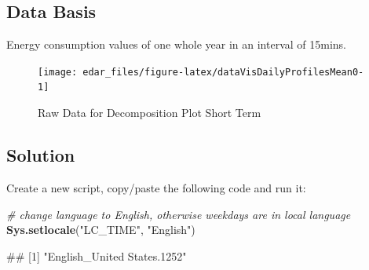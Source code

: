 \documentclass[
  a4paperpaper,
]{book}
\newenvironment{Shaded}{\begin{snugshade}}{\end{snugshade}}
\newcommand{\CommentTok}[1]{\textcolor[rgb]{0.56,0.35,0.01}{\textit{#1}}}
\newcommand{\KeywordTok}[1]{\textcolor[rgb]{0.13,0.29,0.53}{\textbf{#1}}}
\newcommand{\NormalTok}[1]{#1}
\newcommand{\StringTok}[1]{\textcolor[rgb]{0.31,0.60,0.02}{#1}}
\let\oldShaded\Shaded
\let\endoldShaded\endShaded
\renewenvironment{Shaded}{\footnotesize\oldShaded}{\endoldShaded}
\let\oldverbatim\verbatim
\let\endoldverbatim\endverbatim
\renewenvironment{verbatim}{\footnotesize\oldverbatim}{\endoldverbatim}
\begin{document}
\hypertarget{data-basis-14}{%
\subsection{Data Basis}\label{data-basis-14}}

Energy consumption values of one whole year in an interval of 15mins.

\begin{figure}
\texttt{[image: edar\_files/figure-latex/dataVisDailyProfilesMean0-1]} \caption{Raw Data for Decomposition Plot Short Term}\label{fig:dataVisDailyProfilesMean0}
\end{figure}

\newpage

\hypertarget{solution-14}{%
\subsection{Solution}\label{solution-14}}

Create a new script, copy/paste the following code and run it:

\begin{Shaded}
\begin{Highlighting}[]
\CommentTok{# change language to English, otherwise weekdays are in local language}
\KeywordTok{Sys.setlocale}\NormalTok{(}\StringTok{"LC_TIME"}\NormalTok{, }\StringTok{"English"}\NormalTok{)}
\end{Highlighting}
\end{Shaded}

\begin{verbatim}
## [1] "English_United States.1252"
\end{verbatim}
\end{document}
